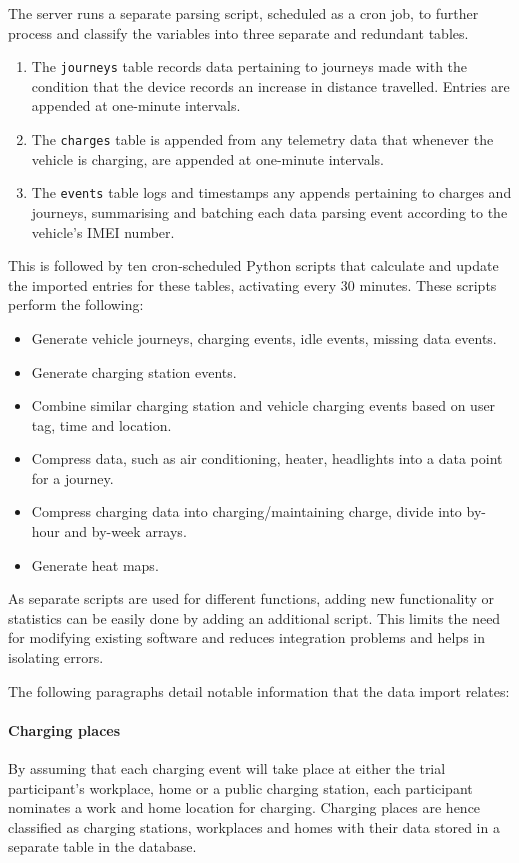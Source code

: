 The server runs a separate parsing script, scheduled as a cron job, to further process and classify the variables into three separate and redundant tables.
\begin{enumerate}
	\item The \texttt{journeys} table records data pertaining to journeys made with the condition that the device records an increase in distance travelled. Entries are appended at one-minute intervals.
	\item The \texttt{charges} table is appended from any telemetry data that whenever the vehicle is charging, are appended at one-minute intervals.
	\item The \texttt{events} table logs and timestamps any appends pertaining to charges and journeys, summarising and batching each data parsing event according to the vehicle’s IMEI number.
\end{enumerate}
This is followed by ten cron-scheduled Python scripts that calculate and update the imported entries for these tables, activating every 30 minutes. These scripts perform the following:
\begin{itemize}
	\item Generate vehicle journeys, charging events, idle events, missing data events.
	\item Generate charging station events.
	\item Combine similar charging station and vehicle charging events based on user tag, time and location.
	\item Compress data, such as air conditioning, heater, headlights into a data point for a journey.
	\item Compress charging data into charging/maintaining charge, divide into by-hour and by-week arrays.
	\item Generate heat maps.
\end{itemize}

As separate scripts are used for different functions, adding new functionality or statistics can be easily done by adding an additional script. This limits the need for modifying existing software and reduces integration problems and helps in isolating errors.

The following paragraphs detail notable information that the data import relates:

\paragraph{Charging places} By assuming that each charging event will take place at either the trial participant’s workplace, home or a public charging station, each participant nominates a work and home location for charging. Charging places are hence classified as charging stations, workplaces and homes with their data stored in a separate table in the database.

